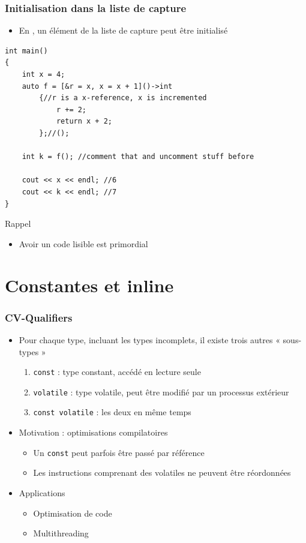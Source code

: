 \begin{frame}[containsverbatim]
\frametitle{Initialisation dans la liste de capture}
\begin{itemize}
\item En , un élément de la liste de capture peut être initialisé
\end{itemize}
\begin{lstlisting}
int main()
{
	int x = 4;
	auto f = [&r = x, x = x + 1]()->int
	    {//r is a x-reference, x is incremented
	        r += 2;
	        return x + 2;
	    };//();

	int k = f(); //comment that and uncomment stuff before

	cout << x << endl; //6
	cout << k << endl; //7
}
\end{lstlisting}
\begin{alertblock}{Rappel}
	\begin{itemize}
	\item Avoir un code lisible est primordial
	\end{itemize}
\end{alertblock}
\end{frame}

\section{Constantes et inline}

\begin{frame}
\frametitle{CV-Qualifiers}
\begin{itemize}[<+->]
\item Pour chaque type, incluant les types incomplets, il existe trois autres « sous-types »
	\begin{enumerate}
	\item \lstinline|const| : type constant, accédé en lecture seule
	\item \lstinline|volatile| : type volatile, peut être modifié par un processus extérieur
	\item \lstinline|const volatile| : les deux en même temps
	\end{enumerate}
\item Motivation : optimisations compilatoires
	\begin{itemize}
	\item Un \lstinline|const| peut parfois être passé par référence
	\item Les instructions comprenant des volatiles ne peuvent être réordonnées
	\end{itemize}
\item Applications
	\begin{itemize}
	\item Optimisation de code
	\item Multithreading
	\end{itemize}
\end{itemize}
\end{frame}

